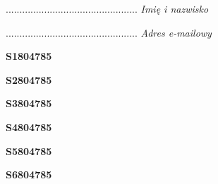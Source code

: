 \begin{turn}{90}\begin{minipage}{\linewidth} \vspace{20mm} ................................................  \textit{Imię i nazwisko}\end{minipage}\end{turn}

\begin{turn}{90}\begin{minipage}{\linewidth} \vspace{20mm} ................................................  \textit{Adres e-mailowy}\end{minipage}\end{turn}

\begin{turn}{90}\huge \begin{minipage}{\linewidth} \vspace{10mm}\textbf{S1804785}\end{minipage}\end{turn}

\begin{turn}{90}\huge \begin{minipage}{\linewidth} \vspace{10mm}\textbf{S2804785}\end{minipage}\end{turn}

\begin{turn}{90}\huge \begin{minipage}{\linewidth} \vspace{10mm}\textbf{S3804785}\end{minipage}\end{turn}

\begin{turn}{90}\huge \begin{minipage}{\linewidth} \vspace{10mm}\textbf{S4804785}\end{minipage}\end{turn}

\begin{turn}{90}\huge \begin{minipage}{\linewidth} \vspace{10mm}\textbf{S5804785}\end{minipage}\end{turn}

\begin{turn}{90}\huge \begin{minipage}{\linewidth} \vspace{10mm}\textbf{S6804785}\end{minipage}\end{turn}


